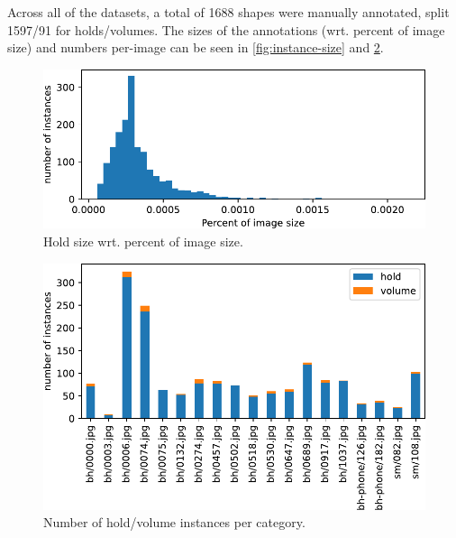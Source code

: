 \documentclass[final]{cvpr}
\begin{document}

Across all of the datasets, a total of 1688 shapes were manually annotated, split 1597/91 for holds/volumes.
The sizes of the annotations (wrt. percent of image size) and numbers per-image can be seen in \autoref{fig:instance-size} and \ref{fig:instance-per-category}.

\begin{figure}[h]
\centering
\includegraphics[width = \linewidth]{img/statistics/instance_size.pdf}
\caption{Hold size wrt. percent of image size.}
\label{fig:instance-size}
\end{figure}

\begin{figure}[h]
\centering
\includegraphics[width = \linewidth]{img/statistics/instances_per_category.pdf}
\caption{Number of hold/volume instances per category.}
\label{fig:instance-per-category}
\end{figure}
\end{document}
